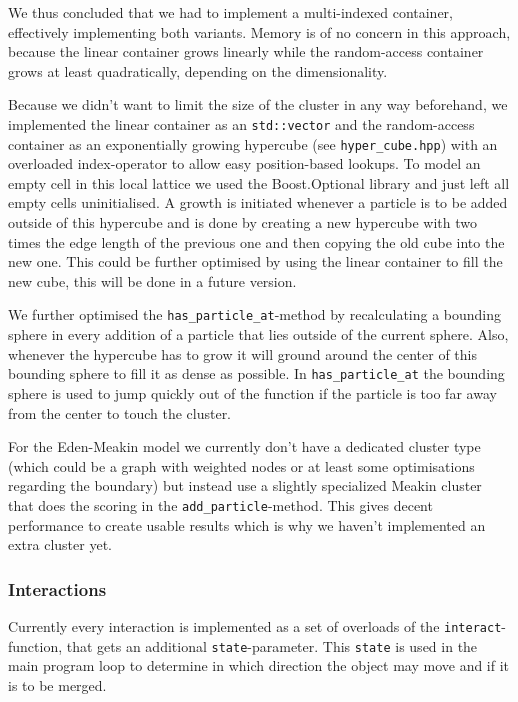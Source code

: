 \documentclass[twocolumn, 10pt]{scrartcl}
\begin{document}
                We thus concluded that we had to implement a multi-indexed container, effectively implementing both
                variants. Memory is of no concern in this approach, because the linear container grows linearly while
                the random-access container grows at least quadratically, depending on the dimensionality.

                Because we didn't want to limit the size of the cluster in any way beforehand, we implemented the linear
                container as an \lstinline'std::vector' and the random-access container as an exponentially growing
                hypercube (see \lstinline'hyper_cube.hpp') with an overloaded index-operator to allow easy
                position-based lookups. To model an empty cell in this local lattice we used the Boost.Optional
                library\cite{boost-optional} and just left all empty cells uninitialised. A growth is initiated whenever
                a particle is to be added outside of this hypercube and is done by creating a new hypercube with two
                times the edge length of the previous one and then copying the old cube into the new one. This could be
                further optimised by using the linear container to fill the new cube, this will be done in a future
                version.

                We further optimised the \lstinline'has_particle_at'-method by recalculating a bounding sphere in every
                addition of a particle that lies outside of the current sphere. Also, whenever the hypercube has to grow
                it will ground around the center of this bounding sphere to fill it as dense as possible. In
                \lstinline'has_particle_at' the bounding sphere is used to jump quickly out of the function if the
                particle is too far away from the center to touch the cluster.

                For the Eden-Meakin model we currently don't have a dedicated cluster type (which could be a graph with
                weighted nodes or at least some optimisations regarding the boundary) but instead use a slightly
                specialized Meakin cluster that does the scoring in the \lstinline'add_particle'-method. This gives
                decent performance to create usable results which is why we haven't implemented an extra cluster yet.

            \subsubsection{Interactions}
                Currently every interaction is implemented as a set of overloads of the \lstinline'interact'-function,
                that gets an additional \lstinline'state'-parameter. This \lstinline'state' is used in the main program
                loop to determine in which direction the object may move and if it is to be merged.
\end{document}
